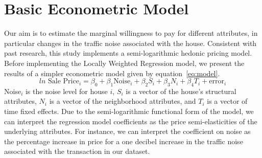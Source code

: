 \documentclass{article}\usepackage{graphicx, color}
\begin{document}
\section{Basic Econometric Model}\label{basicModel}
Our aim is to estimate the marginal willingness to pay for different attributes, in particular changes in the traffic noise associated with the house. Consistent with past research, this study implements a semi-logarithmic hedonic pricing model.  Before implementing the Locally Weighted Regression model, we present the results of a simpler econometric model given by equation~\eqref{eq:model}.
\begin{equation}\label{eq:model}	
ln \textrm{ Sale Price}_i = \beta _0 + \beta _1 \textrm{Noise}_i+ \beta _2 S_i+ \beta _3 N_i + \beta _4 T_i + \textrm{error}_i
\end{equation}
Noise$_i$ is the noise level for house $i$, $S_i$ is a vector of the house's structural attributes, $N_i$ is a vector of the neighborhood attributes, and $T_i$ is a vector of time fixed effects. Due to the semi-logarithmic functional form of the model, we can interpret the regression model coefficients as the price semi-elasticities of the underlying attributes. For instance, we can interpret the coefficient on noise as the percentage increase in price for a one decibel increase in the traffic noise associated with the transaction in our dataset. 
\end{document}
